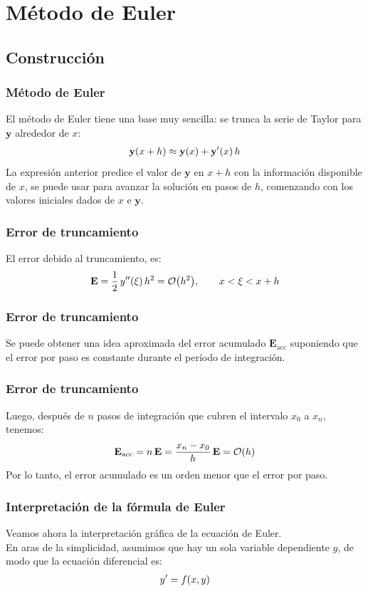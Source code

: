 \documentclass[12pt]{beamer}
\begin{document}
\section{Método de Euler}
\subsection{Construcción}

\begin{frame}
\frametitle{Método de Euler}
El método de Euler tiene una base muy sencilla: \pause se trunca la serie de Taylor para $\mathbf{y}$ alrededor de $x$:
\begin{align*}
\mathbf{y} (x + h) \approx \mathbf{y} (x) + {\mathbf{y}}^{\prime} (x) \, h
\end{align*}
La expresión anterior predice el valor de $\mathbf{y}$ en $x + h$ con la información disponible de $x$, se puede usar para avanzar la solución en pasos de $h$, comenzando con los valores iniciales dados de $x$ e $\mathbf{y}$.
\end{frame}
\begin{frame}
\frametitle{Error de truncamiento}
El error debido al truncamiento, es:
\pause
\begin{align*}
\mathbf{E} = \dfrac{1}{2} \, \sderivada{y} (\xi) \, h^{2} = \order{h^{2}}, \hspace{0.7cm} x < \xi < x + h
\end{align*}
\end{frame}
\begin{frame}
\frametitle{Error de truncamiento}
Se puede obtener una idea aproximada del error acumulado $\mathbf{E}_{\text{acc}}$ suponiendo que el error por paso es constante durante el período de integración.
\end{frame}
\begin{frame}
\frametitle{Error de truncamiento}
Luego, después de $n$ pasos de integración que cubren el intervalo $x_{0}$ a $x_{n}$, tenemos:
\pause
\begin{align*}
\mathbf{E}_{\text{acc}} = n \, \mathbf{E} = \dfrac{x_{n} - x_{0}}{h} \, \mathbf{E} = \order{h}
\end{align*}
Por lo tanto, el error acumulado es un orden menor que el error por paso.
\end{frame}
\begin{frame}
\frametitle{Interpretación de la fórmula de Euler}
Veamos ahora la interpretación gráfica de la ecuación de Euler.
\\
\bigskip
\pause
En aras de la simplicidad, asumimos que hay un sola variable dependiente $y$, de modo que la ecuación diferencial es:
\begin{align*}
{y}^{\prime} = f (x, y)
\end{align*}
\end{frame}
\end{document}
